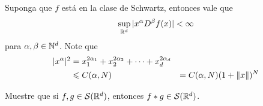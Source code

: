 \documentclass[12pt]{memoir}
\begin{document}
\begin{ptcbp}%
  Suponga que $f$ está en la clase de Schwartz, entonces vale que 
  $$\sup_{\mathbb{R}^d}|x^\alpha D^\beta f(x)|<\infty$$
  para $\alpha,\beta\in\mathbb{N}^d$. Note que 
  \begin{align*}
    |x^\alpha|^2&=x_1^{2\alpha_1}+x_2^{2\alpha_2}+\dots+x_d^{2\alpha_d}\\
    &\leqslant C(\alpha,N)
    &= C(\alpha,N)(1+\left\|x\right\|)^N
  \end{align*}
\end{ptcbp}

\begin{Ej}
  Muestre que si $f,g\in\mathcal{S}(\mathbb{R}^d)$, entonces $f\ast g\in\mathcal{S}(\mathbb{R}^d)$.
 \end{Ej}

 \begin{ptcbp}%
   
 \end{ptcbp}
\ifx\nextra\undefined
\printindex
\else\fi
\nocite{*}


\end{document}
